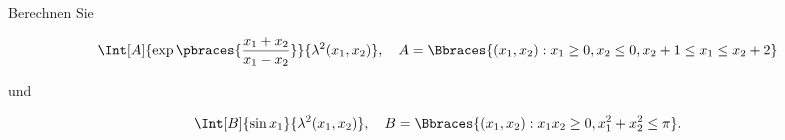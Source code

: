 
\begin{exercise}

Berechnen Sie

\begin{align*}
    \Int[A]{\exp \pbraces{\frac{x_1 + x_2}{x_1 - x_2}}}{\lambda^2(x_1, x_2)},
    \quad
    A = \Bbraces{(x_1, x_2): x_1 \geq 0, x_2 \leq 0, x_2 + 1 \leq x_1 \leq x_2 + 2}
\end{align*}

und

\begin{align*}
    \Int[B]{\sin x_1}{\lambda^2(x_1, x_2)},
    \quad
    B = \Bbraces{(x_1, x_2): x_1 x_2 \geq 0, x_1^2 + x_2^2 \leq \pi}.
\end{align*}

\end{exercise}


